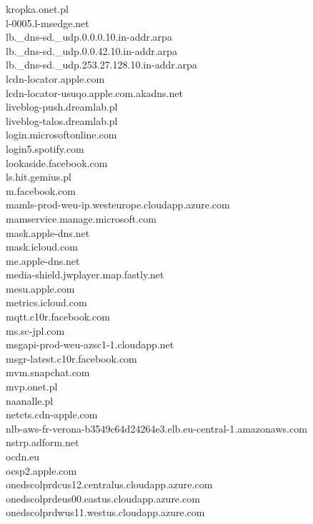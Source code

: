 \documentclass[12pt,a4paper]{article}
\begin{document}
\begin{scriptsize}
\begin{multicols}{3}
\begin{center}
                    kropka.onet.pl\\l-0005.l-msedge.net\\lb.\_dns-sd.\_udp.0.0.0.10.in-addr.arpa\\lb.\_dns-sd.\_udp.0.0.42.10.in-addr.arpa\\
                    lb.\_dns-sd.\_udp.253.27.128.10.in-addr.arpa\\lcdn-locator.apple.com\\lcdn-locator-usuqo.apple.com.akadns.net\\liveblog-push.dreamlab.pl\\
                    liveblog-talos.dreamlab.pl\\login.microsoftonline.com\\login5.spotify.com\\lookaside.facebook.com\\ls.hit.gemius.pl\\m.facebook.com\\
                    mamls-prod-weu-ip.westeurope.cloudapp.azure.com\\mamservice.manage.microsoft.com\\mask.apple-dns.net\\mask.icloud.com\\me.apple-dns.net\\
                    media-shield.jwplayer.map.fastly.net\\mesu.apple.com\\metrics.icloud.com\\mqtt.c10r.facebook.com\\ms.sc-jpl.com\\
                    msgapi-prod-weu-azsc1-1.cloudapp.net\\msgr-latest.c10r.facebook.com\\mvm.snapchat.com\\mvp.onet.pl\\naanalle.pl\\
                    netcts.cdn-apple.com\\nlb-aws-fr-verona-b3549c64d24264e3.elb.eu-central-1.amazonaws.com\\nstrp.adform.net\\ocdn.eu\\ocsp2.apple.com\\
                    onedscolprdcus12.centralus.cloudapp.azure.com\\onedscolprdeus00.eastus.cloudapp.azure.com\\onedscolprdwus11.westus.cloudapp.azure.com\\

\end{center}
\end{multicols}
\end{scriptsize}
\end{document}

